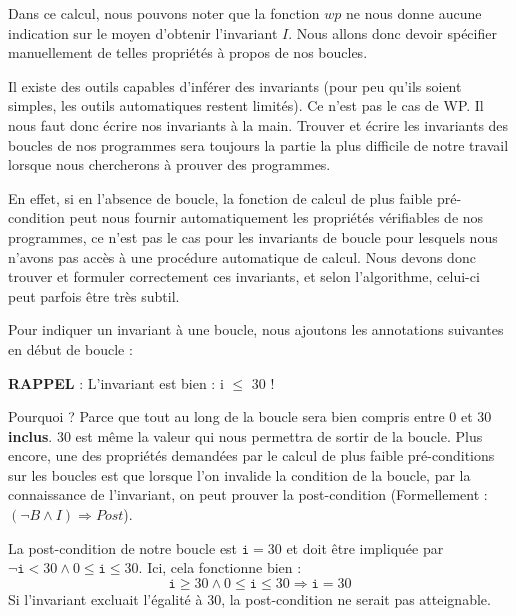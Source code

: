 Dans ce calcul, nous pouvons noter que la fonction $wp$ ne nous donne aucune
indication sur le moyen d'obtenir l'invariant $I$. Nous allons donc devoir 
spécifier manuellement de telles propriétés à propos de nos boucles.





Il existe des outils capables d'inférer des invariants (pour peu qu'ils soient
simples, les outils automatiques restent limités). Ce n'est pas le cas de WP.
Il nous faut donc écrire nos invariants à la main. Trouver et écrire les 
invariants des boucles de nos programmes sera toujours la partie la plus difficile
de notre travail lorsque nous chercherons à prouver des programmes.



En effet, si en l'absence de boucle, la fonction de calcul de plus faible 
pré-condition peut nous fournir automatiquement les propriétés vérifiables de nos
programmes, ce n'est pas le cas pour les invariants de boucle pour lesquels 
nous n'avons pas accès à une procédure automatique de calcul. Nous devons donc 
trouver et formuler correctement ces invariants, et selon l'algorithme, celui-ci
peut parfois être très subtil.



Pour indiquer un invariant à une boucle, nous ajoutons les annotations suivantes
en début de boucle :






\begin{Warning}
\textbf{RAPPEL} : L'invariant est bien : i \textbf{$\leq$} 30 !
\end{Warning}


Pourquoi ? Parce que tout au long de la boucle  sera bien compris entre
0 et 30 \textbf{inclus}. 30 est même la valeur qui nous permettra de sortir de la 
boucle. Plus encore, une des propriétés demandées par le calcul de plus faible
pré-conditions sur les boucles est que lorsque l'on invalide la condition de la
boucle, par la connaissance de l'invariant, on peut prouver la post-condition 
(Formellement : $(\neg B \wedge I) \Rightarrow Post$).



La post-condition de notre boucle est $\texttt{i} = 30$ et doit être impliquée par
$\neg \texttt{i} < 30 \wedge 0 \leq \texttt{i} \leq 30$. Ici, cela fonctionne 
bien : 
$$\texttt{i} \geq 30 \wedge 0 \leq \texttt{i} \leq 30 \Rightarrow \texttt{i} = 30$$
Si l'invariant excluait l'égalité à 30, la post-condition ne serait pas atteignable.




